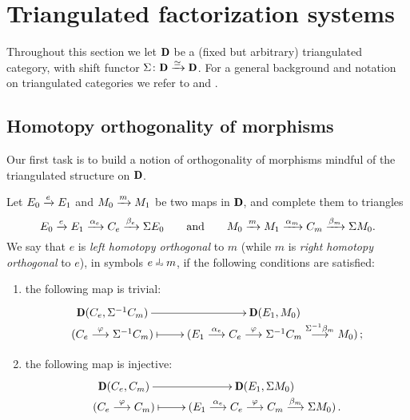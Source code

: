 \section{Triangulated factorization systems}\label{section_homo_FS}
Throughout this section we let $\cD$ be a (fixed but arbitrary) triangulated category, with shift functor $\Sigma\colon \cD \xto{\simeq} \cD$. For a general background and notation on triangulated categories we refer to \cite{Neeman} and \cite[Appendix \textbf{A}]{hps:axiomatic}.

\subsection{Homotopy orthogonality of morphisms}\label{horth_subs}
Our first task is to build a notion of orthogonality of morphisms mindful of the triangulated structure on $\cD$.
\begin{definition}\label{wobbly}
Let $E_0 \xrightarrow{e} E_1$ and $M_0 \xrightarrow{m} M_1$ be two maps in $\cD$, and complete them to triangles
\begin{equation}\label{triangles}
E_0 \xrightarrow{e}  E_1 \xrightarrow{\alpha_e} C_e \xrightarrow{\beta_e} \Sigma E_0
\qquad \text{and}\qquad
M_0 \xrightarrow{m}  M_1 \xrightarrow{\alpha_m} C_m \xrightarrow{\beta_m} \Sigma M_0.
\end{equation}
We say that $e$ is \emph{left homotopy orthogonal} to $m$ (while $m$ is \emph{right homotopy orthogonal} to $e$), in symbols $e \horth m$, if the following conditions are satisfied:
\begin{enumerate}[label=\textsc{ho}\arabic*.]
\item \label{fst}the following map is trivial:
$$\xymatrix@R=0pt{\cD(C_e,\Sigma^{-1}C_m)\ar[r]& \cD(E_1,M_0)\\
(C_e\overset{\varphi}{\longrightarrow}\Sigma^{-1}C_m)\ar@{|->}[r]&(E_1\overset{\alpha_e}{\longrightarrow}C_e\overset{\varphi}{\longrightarrow}\Sigma^{-1}C_m\overset{\Sigma^{-1}\beta_m}{\longrightarrow}M_0)\,;}$$
\item \label{snd}the following map is injective:
$$\xymatrix@R=0pt{\cD(C_e,C_m)\ar[r]& \cD(E_1,\Sigma M_0)\\
(C_e\overset{\varphi}{\longrightarrow}C_m)\ar@{|->}[r]&(E_1\overset{\alpha_e}{\longrightarrow}C_e\overset{\varphi}{\longrightarrow}C_m\overset{\beta_m}{\longrightarrow}\Sigma M_0)\,.}$$
\end{enumerate}
\end{definition}


